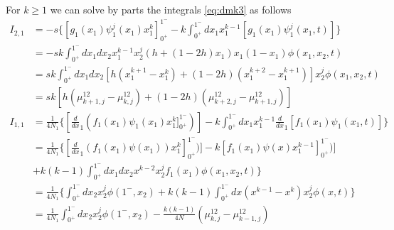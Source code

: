 \documentclass[a4paper, 12pt]{article}
\newcommand{\dev}[1]{\ensuremath{\frac{d}{d #1}}}
\begin{document}
For $k \geq 1$ we can solve by parts the integrals \eqref{eq:dmk3} as follows
\begin{align}
  I_{2,1} &= -s\{[g_1(x_1)\psi_1^j(x_1)x_1^k]_{0^+}^{1^-} - 
  k \int_{0^+}^{1^-} dx_1 x_1^{k -1} [g_1(x_1)\psi_1^j(x_1,t)]\}  
  \nonumber \\
  &= - sk \int_{0^+}^{1^-} dx_1 dx_2 
  x_1^{k -1} x_2^j (h + (1 - 2 h)x_1) x_1 (1 - x_1)\phi(x_1, x_2, t)  
  \nonumber \\
  &= sk \int_{0^+}^{1^-} dx_1 dx_2 [h(x_1^{k + 1} - x_1^{k}) + 
  (1 - 2 h)(x_1^{k + 2} - x_1^{k + 1})]x_2^j\phi(x_1, x_2, t)
  \nonumber \\
  &= sk [h(\mu_{k + 1,j}^{12} - \mu_{k,j}^{12}) + 
  (1 - 2 h)(\mu_{k + 2,j}^{12} - \mu_{k + 1,j}^{12})]
  \label{eq:I21}
  \\
  I_{1,1} &= \frac{1}{4N_1}\{[\dev x_1 (f_1(x_1)\psi_1(x_1)x_1^k]_{0^+}^{1^-})] - 
      k \int_{0^+}^{1^-} dx_1 x_1^{k -1} \dev x_1 [f_1(x_1)\psi_1(x_1,t)]\}
  \nonumber \\
   &= \frac{1}{4N_1}\{[\dev x_1 (f_1(x_1)\psi(x_1))x_1^k]_{0^+}^{1^-})] - 
      k[f_1(x_1)\psi(x)x_1^{k-1}]_{0^+}^{1^-})]
      \nonumber \\
  \quad &+ k(k -1) \int_{0^+}^{1^-} dx_1 dx_2x^{k - 2} x_2^jf_1(x_1)\phi(x_1, x_2,t)\}
  \nonumber \\
   &= \frac{1}{4N_1}\{\int_{0^+}^{1^-} dx_2 x_2^j \phi(1^-,x_2) 
   + k(k -1) \int_{0^+}^{1^-} dx (x^{k - 1} - x^k )x_2^j \phi(x,t)\}
  \nonumber \\
   &= \frac{1}{4N_1}\int_{0^+}^{1^-} dx_2 x_2^j \phi(1^-,x_2) 
   - \frac{k(k-1)}{4N}(\mu_{k,j}^{12}- \mu_{k-1,j}^{12})
\end{align}

\footnotesize
\twocolumn
\begin{spacing}{1}


\end{spacing}
\end{document}
